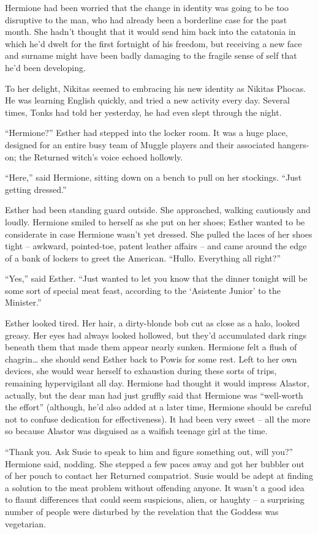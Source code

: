 Hermione had been worried that the change in identity was going to be
too disruptive to the man, who had already been a borderline case for
the past month. She hadn't thought that it would send him back into the
catatonia in which he'd dwelt for the first fortnight of his freedom,
but receiving a new face and surname might have been badly damaging to
the fragile sense of self that he'd been developing.

To her delight, Nikitas seemed to embracing his new identity as Nikitas
Phocas. He was learning English quickly, and tried a new activity every
day. Several times, Tonks had told her yesterday, he had even slept
through the night.

``Hermione?'' Esther had stepped into the locker room. It was a huge
place, designed for an entire busy team of Muggle players and their
associated hangers-on; the Returned witch's voice echoed hollowly.

``Here,'' said Hermione, sitting down on a bench to pull on her
stockings. ``Just getting dressed.''

Esther had been standing guard outside. She approached, walking
cautiously and loudly. Hermione smiled to herself as she put on her
shoes; Esther wanted to be considerate in case Hermione wasn't yet
dressed. She pulled the laces of her shoes tight -- awkward,
pointed-toe, patent leather affairs -- and came around the edge of a
bank of lockers to greet the American. ``Hullo. Everything all right?''

``Yes,'' said Esther. ``Just wanted to let you know that the dinner
tonight will be some sort of special meat feast, according to the
`Asistente Junior' to the Minister.''

Esther looked tired. Her hair, a dirty-blonde bob cut as close as a
halo, looked greasy. Her eyes had always looked hollowed, but they'd
accumulated dark rings beneath them that made them appear nearly sunken.
Hermione felt a flush of chagrin\ldots{} she should send Esther back to
Powis for some rest. Left to her own devices, she would wear herself to
exhaustion during these sorts of trips, remaining hypervigilant all day.
Hermione had thought it would impress Alastor, actually, but the dear
man had just gruffly said that Hermione was ``well-worth the effort''
(although, he'd also added at a later time, Hermione should be careful
not to confuse dedication for effectiveness). It had been very sweet --
all the more so because Alastor was disguised as a waifish teenage girl
at the time.

``Thank you. Ask Susie to speak to him and figure something out, will
you?'' Hermione said, nodding. She stepped a few paces away and got her
bubbler out of her pouch to contact her Returned compatriot. Susie would
be adept at finding a solution to the meat problem without offending
anyone. It wasn't a good idea to flaunt differences that could seem
suspicious, alien, or haughty -- a surprising number of people were
disturbed by the revelation that the Goddess was vegetarian.

